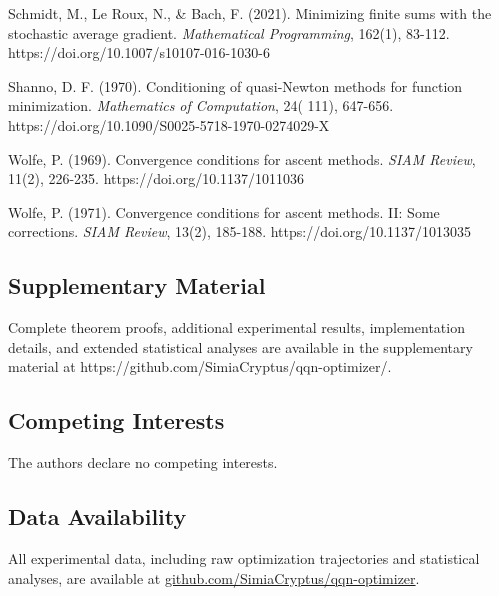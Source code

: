 Schmidt, M., Le Roux, N., \& Bach, F. (2021). Minimizing finite sums with the stochastic average gradient. \emph{Mathematical
Programming}, 162(1), 83-112. https://doi.org/10.1007/s10107-016-1030-6

Shanno, D. F. (1970). Conditioning of quasi-Newton methods for function minimization. \emph{Mathematics of Computation}, 24(
111), 647-656. https://doi.org/10.1090/S0025-5718-1970-0274029-X

Wolfe, P. (1969). Convergence conditions for ascent methods. \emph{SIAM Review}, 11(2),
226-235. https://doi.org/10.1137/1011036

Wolfe, P. (1971). Convergence conditions for ascent methods. II: Some corrections. \emph{SIAM Review}, 13(2),
185-188. https://doi.org/10.1137/1013035

\hypertarget{supplementary-material}{%
\subsection{Supplementary Material}\label{supplementary-material}}

Complete theorem proofs, additional experimental results, implementation details, and extended statistical analyses are
available in the supplementary material at https://github.com/SimiaCryptus/qqn-optimizer/.

\hypertarget{competing-interests}{%
\subsection{Competing Interests}\label{competing-interests}}

The authors declare no competing interests.

\hypertarget{data-availability}{%
\subsection{Data Availability}\label{data-availability}}

All experimental data, including raw optimization trajectories and statistical analyses, are available
at \href{https://github.com/SimiaCryptus/qqn-optimizer/}{github.com/SimiaCryptus/qqn-optimizer}.